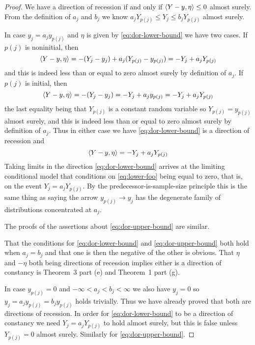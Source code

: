 \begin{proof}
We have a direction of recession if and only if $\langle Y - y, \eta \rangle \le 0$
almost surely.
From the definition
of $a_j$ and $b_j$ we know $a_j Y_{p(j)} \le Y_j \le b_j Y_{p(j)}$
almost surely.

In case $y_j = a_j y_{p(j)}$ and $\eta$ is
given by \eqref{eq:dor-lower-bound} we have two cases.
If $p(j)$ is noninitial, then
$$
   \langle Y - y, \eta \rangle = - (Y_j - y_j) + a_j (Y_{p(j)} - y_{p(j)})
   =
   - Y_j + a_j Y_{p(j)}
$$
and this is indeed less than or equal to zero almost surely by definition
of $a_j$.
If $p(j)$ is initial, then
$$
   \langle Y - y, \eta \rangle = - (Y_j - y_j)
   =
   - Y_j + a_j y_{p(j)}
   =
   - Y_j + a_j Y_{p(j)}
$$
the last equality being that $Y_{p(j)}$ is a constant random variable
so $Y_{p(j)} = y_{p(j)}$ almost surely,
and this is indeed less than or equal to zero almost surely by definition
of $a_j$.  Thus in either case we have \eqref{eq:dor-lower-bound} is
a direction of recession and
\begin{equation} \label{eq:lower-foo}
   \langle Y - y, \eta \rangle = - Y_j + a_j Y_{p(j)}
\end{equation}
Taking limits in the direction \eqref{eq:dor-lower-bound} arrives at
the limiting conditional model that conditions
on \eqref{eq:lower-foo} being equal to zero, that is, on the event
$Y_j = a_j Y_{p(j)}$.  By the predecessor-is-sample-size principle
this is the same thing as saying the arrow
$y_{p(j)} \longrightarrow y_j$ has the degenerate family of distributions
concentrated at $a_j$.

The proofs of the assertions about \eqref{eq:dor-upper-bound} are similar.

That the conditions for \eqref{eq:dor-lower-bound}
and \eqref{eq:dor-upper-bound} both hold when $a_j = b_j$ and that
one is then the negative of the other is obvious.
That $\eta$ and $- \eta$ both being
directions of recession implies either is a direction of constancy is
\citet{geyer-gdor} Theorem~3 part (e) and Theorem~1 part (g).

In case $y_{p(j)} = 0$  and $-\infty < a_j < b_j < \infty$
we also have $y_j = 0$ so $y_j = a_j y_{p(j)} = b_j y_{p(j)}$ holds trivially.
Thus we have already proved that both are directions of recession.
In order for \eqref{eq:dor-lower-bound} to be a direction of constancy
we need $Y_j = a_j Y_{p(j)}$ to hold almost surely, but this is false
unless $Y_{p(j)} = 0$ almost surely.
Similarly for \eqref{eq:dor-upper-bound}.
\end{proof}

